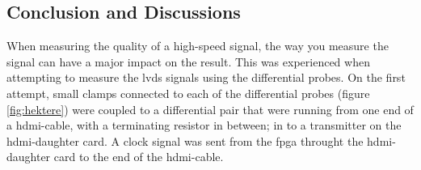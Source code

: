 \documentclass[main.tex]{subfiles}
\begin{document}

\subsection{Conclusion and Discussions}

When measuring the quality of a high-speed signal, the way you measure the signal can have a major impact on the result. This was experienced when attempting to measure the \gls{lvds} signals using the differential probes. On the first attempt, small clamps connected to each of the differential probes (figure \ref{fig:hektere}) were coupled to a differential pair that were running from one end of a hdmi-cable, with a terminating resistor in between; in to a transmitter on the \gls{hdmi}-daughter card. A clock signal was sent from the \gls{fpga} throught the \gls{hdmi}-daughter card to the end of the hdmi-cable. 

\begin{figure}
   \begin{center}
   \end{center}
\end{figure}
\end{document}
